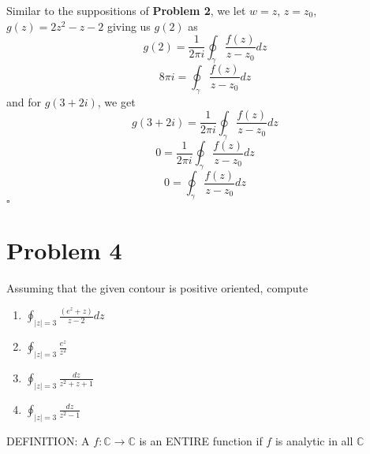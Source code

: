 \documentclass[12pt]{article}
\newcommand{\C}{\mathbb{C}}
\newenvironment{proof}{\noindent{\bf Proof.}}{\hfill $\square$\medskip}
\begin{document}
\begin{proof}
Similar to the suppositions of \textbf{Problem 2}, we let $w=z$, $z=z_{0}$, $g(z)=2z^{2}-z-2$ giving us $g(2)$ as
$$g(2)=\frac{1}{2\pi i}\oint_{\gamma}\frac{f(z)}{z-z_{0}}dz$$
$$8\pi i=\oint_{\gamma}\frac{f(z)}{z-z_{0}}dz$$
and for $g(3+2i)$, we get
$$g(3+2i)=\frac{1}{2\pi i}\oint_{\gamma}\frac{f(z)}{z-z_{0}}dz$$
$$0=\frac{1}{2\pi i}\oint_{\gamma}\frac{f(z)}{z-z_{0}}dz$$
$$0=\oint_{\gamma}\frac{f(z)}{z-z_{0}}dz$$
\end{proof}


\newpage
\section{Problem 4}
Assuming that the given contour is positive oriented, compute
\begin{enumerate}[label=\textbf{(\alph*)}]
    \item $\oint_{\left |z\right |=3}\frac{(e^{z}+z)}{z-2}dz$
    \item $\oint_{\left |z\right |=3}\frac{e^{z}}{z^{2}}$
    \item $\oint_{\left |z\right |=3}\frac{dz}{z^{2}+z+1}$
    \item $\oint_{\left |z\right |=3}\frac{dz}{z^{2}-1}$
\end{enumerate}
DEFINITION: A $f:\C\to\C$ is an ENTIRE function if $f$ is analytic in all $\C$
\end{document}

